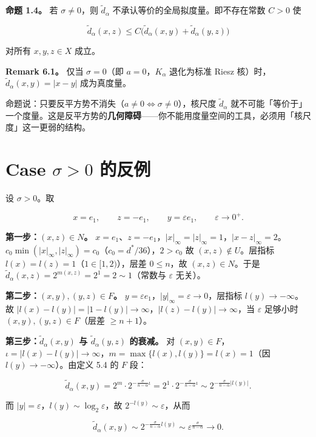 \documentclass[a4paper,11pt,openany]{ctexbook}
\numberwithin{equation}{chapter}
\numberwithin{figure}{chapter}
\numberwithin{table}{chapter}
\begin{document}
\textbf{命题 1.4。} 若 $\sigma\neq0$，则 $\widetilde d_\alpha$ 不承认等价的全局拟度量。即不存在常数 $C>0$ 使

$$\widetilde d_\alpha(x,z)\le C\bigl(\widetilde d_\alpha(x,y)+\widetilde d_\alpha(y,z)\bigr)$$

对所有 $x,y,z\in X$ 成立。

\textbf{Remark 6.1。} 仅当 $\sigma=0$（即 $a=0$，$K_\alpha$ 退化为标准 Riesz 核）时，$\widetilde d_\alpha(x,y)=|x-y|$ 成为真度量。

\begin{intuitionbox}
命题说：只要反平方势不消失（$a\neq0\iff\sigma\neq0$），核尺度 $\widetilde d_\alpha$ 就不可能「等价于」一个度量。这是反平方势的\textbf{几何障碍}——你不能用度量空间的工具，必须用「核尺度」这一更弱的结构。
\end{intuitionbox}

\section{Case $\sigma>0$ 的反例}

设 $\sigma>0$。取

$$x=e_1,\qquad z=-e_1,\qquad y=\varepsilon e_1,\qquad\varepsilon\to0^+.$$

\textbf{第一步：$(x,z)\in N$。} $x=e_1$、$z=-e_1$，$|x|_\infty=|z|_\infty=1$，$|x-z|_\infty=2$。$c_0\min(|x|_\infty,|z|_\infty)=c_0$（$c_0=d^*/36$），$2>c_0$ 故 $(x,z)\notin U$。层指标 $l(x)=l(z)=1$（$1\in[1,2)$），层差 $0\le n$，故 $(x,z)\in N$。于是 $\widetilde d_\alpha(x,z)=2^{m(x,z)}=2^1=2\sim1$（常数与 $\varepsilon$ 无关）。

\textbf{第二步：$(x,y),(y,z)\in F$。} $y=\varepsilon e_1$，$|y|_\infty=\varepsilon\to0$，层指标 $l(y)\to-\infty$。故 $|l(x)-l(y)|=|1-l(y)|\to\infty$，$|l(z)-l(y)|\to\infty$，当 $\varepsilon$ 足够小时 $(x,y),(y,z)\in F$（层差 $\ge n+1$）。

\textbf{第三步：$\widetilde d_\alpha(x,y)$ 与 $\widetilde d_\alpha(y,z)$ 的衰减。} 对 $(x,y)\in F$，$\iota=|l(x)-l(y)|\to\infty$，$m=\max\{l(x),l(y)\}=l(x)=1$（因 $l(y)\to-\infty$）。由定义 5.4 的 $F$ 段：

$$\widetilde d_\alpha(x,y)=2^m\cdot2^{-\frac{\sigma}{n-\alpha}\iota}=2^1\cdot2^{-\frac{\sigma}{n-\alpha}\iota}\sim2^{-\frac{\sigma}{n-\alpha}|l(y)|}.$$

而 $|y|=\varepsilon$，$l(y)\sim\log_2\varepsilon$，故 $2^{-l(y)}\sim\varepsilon$，从而

$$\widetilde d_\alpha(x,y)\sim2^{-\frac{\sigma}{n-\alpha}l(y)}\sim\varepsilon^{\frac{\sigma}{n-\alpha}}\to0.$$
\end{document}
